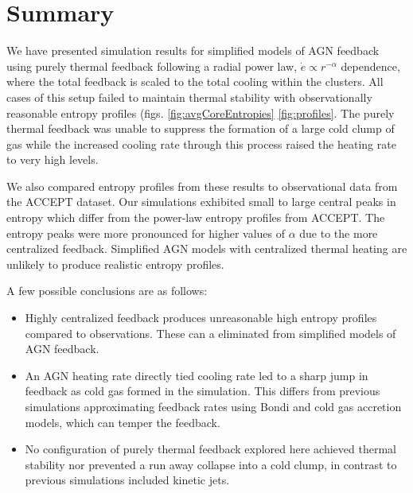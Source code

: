 \documentclass[iop,apjl, twocolappendix]{emulateapj}   %
\begin{document}
\section{Summary}
\label{sec:summary}

We have presented simulation results for simplified models of AGN feedback
using purely thermal feedback following a radial power law, $\dot e \propto
r^{-\alpha}$ dependence, where the total feedback is scaled to the total
cooling within the clusters. All cases of this setup failed to maintain thermal
stability with observationally reasonable entropy profiles (figs.
\ref{fig:avgCoreEntropies} \ref{fig:profiles}. The purely thermal feedback was unable
to suppress the formation of a large cold clump of gas while the increased
cooling rate through this process raised the heating rate to very high levels.

We also compared entropy profiles from these results to observational data from
the ACCEPT dataset. Our simulations exhibited small to large central peaks in
entropy which differ from the power-law entropy profiles from ACCEPT. The
entropy peaks were more pronounced for higher values of $\alpha$ due to the
more centralized feedback. Simplified AGN models with centralized thermal
heating are unlikely to produce realistic entropy profiles.

A few possible conclusions are as follows:
\begin{itemize}
  \item Highly centralized feedback produces unreasonable high entropy profiles
    compared to observations. These can a eliminated from simplified models of
    AGN feedback.
  \item An AGN heating rate directly tied cooling rate led to a sharp jump in
    feedback as cold gas formed in the simulation. This differs from previous
    simulations approximating feedback rates using Bondi and cold gas accretion
    models, which can temper the feedback.
  \item No configuration of purely thermal feedback explored here achieved
    thermal stability nor prevented a run away collapse into a cold clump, in
    contrast to previous simulations included kinetic jets.
\end{itemize}

\end{document}
